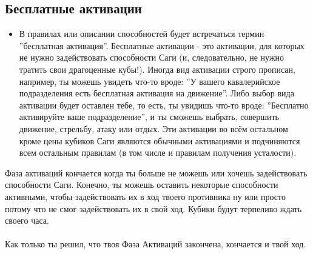 \documentclass[a4paper,11pt,twoside]{article}
\begin{document}
\subsection*{Бесплатные активации}
\begin{itemize}
	\item В правилах или описании способностей будет встречаться термин ''бесплатная активация''. Бесплатные активации - это активации, для которых не нужно задействовать способности Саги (и, следовательно, не нужно тратить свои драгоценные кубы!). Иногда вид активации строго прописан, например, ты можешь увидеть что-то вроде: ''У вашего кавалерийское подразделения есть бесплатная активация на движение''. Либо выбор вида активации будет оставлен тебе, то есть, ты увидишь что-то вроде: ''Бесплатно активируйте ваше подразделение'', и ты сможешь выбрать, совершить движение, стрельбу, атаку или отдых. Эти активации во всём остальном кроме цены кубиков Саги являются обычными активациями и подчиняются всем остальным правилам (в том числе и правилам получения усталости).
\end{itemize} 

Фаза активаций кончается когда ты больше не можешь или хочешь задействовать способности Саги. Конечно, ты можешь оставить некоторые способности активными, чтобы задействовать их в ход твоего противника ну или просто потому что не смог задействовать их в свой ход. Кубики будут терпеливо ждать своего часа. \\ \\
Как только ты решил, что твоя Фаза Активаций закончена, кончается и твой ход. \\ \\
\end{document}
